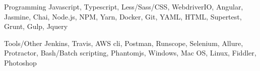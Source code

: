 

\begin{cvskills}

  \cvskill
    {Programming} %
    {Javascript, Typescript, Less/Sass/CSS, WebdriverIO, Angular, Jasmine, Chai, Node.js, NPM, Yarn, Docker, Git, YAML, HTML, Supertest, Grunt, Gulp, Jquery} %

  \cvskill
    {Tools/Other} %
    {Jenkins, Travis, AWS cli, Postman, Runscope, Selenium, Allure, Protractor, Bash/Batch scripting, Phantomjs, Windows, Mac OS, Linux, Fiddler, Photoshop} %

\end{cvskills}
